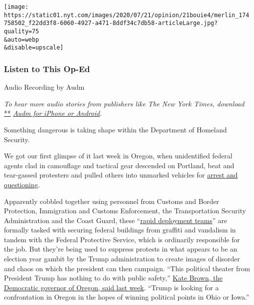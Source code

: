 \texttt{[image: https://static01.nyt.com/images/2020/07/21/opinion/21bouie4/merlin\_174758502\_f22dd3f8-6060-4927-a471-8ddf34c7db58-articleLarge.jpg?quality=75\\\&auto=webp\\\&disable=upscale]}

\hypertarget{listen-to-this-op-ed}{%
\subsubsection{Listen to This Op-Ed}\label{listen-to-this-op-ed}}

Audio Recording by Audm

\emph{To hear more audio stories from publishers like The New York
Times, download}
\href{https://www.audm.com/?utm_source=nytmag\&utm_medium=embed\&utm_campaign=left_behind_draper}{**}
\href{https://www.audm.com/?utm_source=nytopinion\&utm_medium=embed\&utm_campaign=border_war_portland}{\emph{Audm
for iPhone or Android}}\emph{.}

Something dangerous is taking shape within the Department of Homeland
Security.

We got our first glimpse of it last week in Oregon, when unidentified
federal agents clad in camouflage and tactical gear descended on
Portland, beat and tear-gassed protesters and pulled others into
unmarked vehicles for
\href{https://www.washingtonpost.com/nation/2020/07/17/portland-protests-federal-arrests/}{arrest
and questioning}.

Apparently cobbled together using personnel from Customs and Border
Protection, Immigration and Customs Enforcement, the Transportation
Security Administration and the Coast Guard, these
``\href{https://abcnews.go.com/Politics/dhs-launches-rapid-deployment-teams-federal-monuments-july/story?id=71552901}{rapid
deployment teams}'' are formally tasked with securing federal buildings
from graffiti and vandalism in tandem with the Federal Protective
Service, which is ordinarily responsible for the job. But they're being
used to suppress protests in what appears to be an election year gambit
by the Trump administration to create images of disorder and chaos on
which the president can then campaign. ``This political theater from
President Trump has nothing to do with public safety,''
\href{https://www.wweek.com/news/2020/07/16/oregon-gov-kate-brown-says-president-trump-is-invading-portland-as-an-election-stunt/}{Kate
Brown, the Democratic governor of Oregon, said last week}. ``Trump is
looking for a confrontation in Oregon in the hopes of winning political
points in Ohio or Iowa.''

